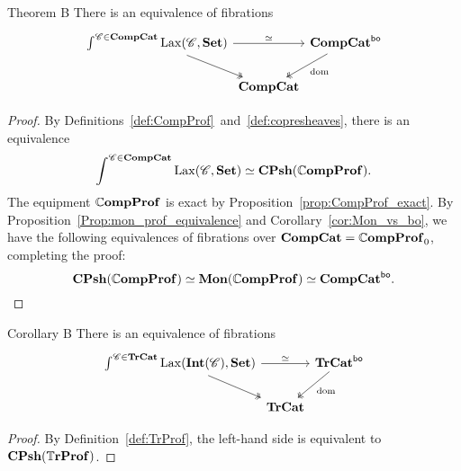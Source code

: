 \documentclass[12pt,oneside,article,draft]{memoir}
\begin{document}
\begin{named}{Theorem B}\label{thm:TheoremB}
   There is an equivalence of fibrations
   \begin{equation*}
      \begin{tikzcd}[column sep=0em]
         \int^{\cat{C}\in\CompCat}\Lax(\cat{C},\Set) \ar[rr,"\equiv"] \ar[dr,two heads]
            && \CompCat^{\bo} \ar[dl,two heads,"\dom"] \\
            & \CompCat &
      \end{tikzcd}
   \end{equation*}
\end{named}

\begin{proof}
By Definitions~\ref{def:CompProf}~and~\ref{def:copresheaves}, there is an equivalence
$$ \int^{\mathscr{C}\in\mathbf{CompCat}}\operatorname{Lax}(\mathscr{C},\mathbf{Set})\simeq\mathbf{CPsh}(\mathbb{C}\mathbf{ompProf}).$$ 
The equipment $\mathbb{C}\mathbf{ompProf}$ is exact by Proposition~\ref{prop:CompProf_exact}. By Proposition~\ref{Prop:mon_prof_equivalence} and Corollary~\ref{cor:Mon_vs_bo}, we have the following equivalences of fibrations over $\mathbf{CompCat}=\mathbb{C}\mathbf{ompProf}_0$, completing the proof:
$$\mathbf{CPsh}(\mathbb{C}\mathbf{ompProf})\simeq\mathbf{Mon}(\mathbb{C}\mathbf{ompProf})\simeq\mathbf{CompCat}^{\mathsf{bo}}.$$ 
\end{proof}

\begin{named}{Corollary B}\label{cor:CorollaryB}
   There is an equivalence of fibrations
   \begin{equation*}
      \begin{tikzcd}[column sep=0em]
         \int^{\cat{C}\in\TrCat}\Lax(\Int(\cat{C}),\Set) \ar[rr,"\equiv"] \ar[dr,two heads]
            && \TrCat^{\bo} \ar[dl,two heads,"\dom"] \\
            & \TrCat &
      \end{tikzcd}
   \end{equation*}
\end{named}

\begin{proof}
By Definition~\ref{def:TrProf}, the left-hand side is equivalent to $\mathbf{CPsh}(\mathbb{T}\mathbf{rProf})$. 
\end{proof}
\end{document}
